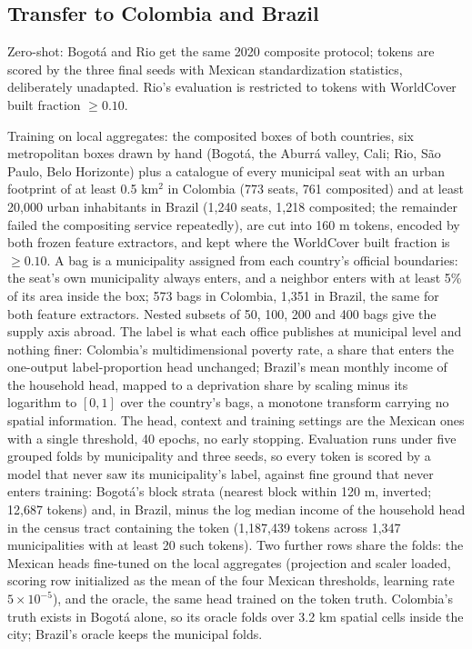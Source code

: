 \documentclass[11pt]{article}
\begin{document}
\subsection{Transfer to Colombia and Brazil}

Zero-shot: Bogot\'a and Rio get the same 2020 composite protocol; tokens are scored by
the three final seeds with Mexican standardization statistics, deliberately unadapted.
Rio's evaluation is restricted to tokens with WorldCover built fraction $\geq 0.10$.

Training on local aggregates: the composited boxes of both countries, six metropolitan
boxes drawn by hand (Bogot\'a, the Aburr\'a valley, Cali; Rio, S\~ao Paulo, Belo
Horizonte) plus a catalogue of every municipal seat with an urban footprint of at least
0.5 km$^2$ in Colombia (773 seats, 761 composited) and at least 20{,}000 urban
inhabitants in Brazil (1{,}240 seats, 1{,}218 composited; the remainder failed the
compositing service repeatedly), are cut into 160 m tokens, encoded by both frozen
feature extractors, and kept where the WorldCover built fraction is $\geq 0.10$. A bag is
a municipality assigned from each country's official boundaries: the seat's own
municipality always enters, and a neighbor enters with at least 5\% of its area inside
the box; 573 bags in Colombia, 1{,}351 in Brazil, the same for both feature extractors.
Nested subsets of 50, 100, 200 and 400 bags give the supply axis abroad.
The label is what each office publishes at municipal level and nothing finer: Colombia's
multidimensional poverty rate, a share that enters the one-output label-proportion head
unchanged; Brazil's mean monthly income of the household head, mapped to a deprivation
share by scaling minus its logarithm to $[0, 1]$ over the country's bags, a monotone
transform carrying no spatial information. The head, context and training settings are
the Mexican ones with a single threshold, 40 epochs, no early stopping. Evaluation runs
under five grouped folds by municipality and three seeds, so every token is scored by a
model that never saw its municipality's label, against fine ground that never enters
training: Bogot\'a's block strata (nearest block within 120 m, inverted; 12{,}687
tokens) and, in Brazil, minus the log median income of the household head in the census
tract containing the token (1{,}187{,}439 tokens across 1{,}347 municipalities with at
least 20 such tokens). Two further rows share the folds: the Mexican heads fine-tuned on the local
aggregates (projection and scaler loaded, scoring row initialized as the mean of the four
Mexican thresholds, learning rate $5 \times 10^{-5}$), and the oracle, the same head
trained on the token truth. Colombia's truth exists in Bogot\'a alone, so its oracle folds
over 3.2 km spatial cells inside the city; Brazil's oracle keeps the municipal folds.
\end{document}
